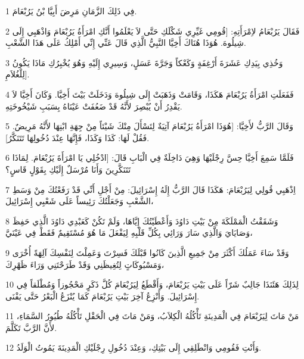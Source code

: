 \par 1 فِي ذَلِكَ الزَّمَانِ مَرِضَ أَبِيَّا بْنُ يَرُبْعَامَ.
\par 2 فَقَالَ يَرُبْعَامُ لاِمْرَأَتِهِ: [قُومِي غَيِّرِي شَكْلَكِ حَتَّى لاَ يَعْلَمُوا أَنَّكِ امْرَأَةُ يَرُبْعَامَ وَاذْهَبِي إِلَى شِيلُوهَ. هُوَذَا هُنَاكَ أَخِيَّا النَّبِيُّ الَّذِي قَالَ عَنِّي إِنِّي أَمْلِكُ عَلَى هَذَا الشَّعْبِ.
\par 3 وَخُذِي بِيَدِكِ عَشَرَةَ أَرْغِفَةٍ وَكَعْكاً وَجَرَّةَ عَسَلٍ، وَسِيرِي إِلَيْهِ وَهُوَ يُخْبِرُكِ مَاذَا يَكُونُ لِلْغُلاَمِ].
\par 4 فَفَعَلَتِ امْرَأَةُ يَرُبْعَامَ هَكَذَا، وَقَامَتْ وَذَهَبَتْ إِلَى شِيلُوهَ وَدَخَلَتْ بَيْتَ أَخِيَّا. وَكَانَ أَخِيَّا لاَ يَقْدِرُ أَنْ يُبْصِرَ لأَنَّهُ قَدْ ضَعُفَتْ عَيْنَاهُ بِسَبَبِ شَيْخُوخَتِهِ.
\par 5 وَقَالَ الرَّبُّ لأَخِيَّا: [هُوَذَا امْرَأَةُ يَرُبْعَامَ آتِيَةٌ لِتَسْأَلَ مِنْكَ شَيْئاً مِنْ جِهَةِ ابْنِهَا لأَنَّهُ مَرِيضٌ. فَقُلْ لَهَا: كَذَا وَكَذَا، فَإِنَّهَا عِنْدَ دُخُولِهَا تَتَنَكَّرُ].
\par 6 فَلَمَّا سَمِعَ أَخِيَّا حِسَّ رِجْلَيْهَا وَهِيَ دَاخِلَةٌ فِي الْبَابِ قَالَ: [ادْخُلِي يَا امْرَأَةَ يَرُبْعَامَ. لِمَاذَا تَتَنَكَّرِينَ وَأَنَا مُرْسَلٌ إِلَيْكِ بِقَوْلٍ قَاسٍ؟
\par 7 اِذْهَبِي قُولِي لِيَرُبْعَامَ: هَكَذَا قَالَ الرَّبُّ إِلَهُ إِسْرَائِيلَ: مِنْ أَجْلِ أَنِّي قَدْ رَفَعْتُكَ مِنْ وَسَطِ الشَّعْبِ وَجَعَلْتُكَ رَئِيساً عَلَى شَعْبِي إِسْرَائِيلَ،
\par 8 وَشَقَقْتُ الْمَمْلَكَةَ مِنْ بَيْتِ دَاوُدَ وَأَعْطَيْتُكَ إِيَّاهَا، وَلَمْ تَكُنْ كَعَبْدِي دَاوُدَ الَّذِي حَفِظَ وَصَايَايَ وَالَّذِي سَارَ وَرَائِي بِكُلِّ قَلْبِهِ لِيَفْعَلَ مَا هُوَ مُسْتَقِيمٌ فَقَطْ فِي عَيْنَيَّ،
\par 9 وَقَدْ سَاءَ عَمَلُكَ أَكْثَرَ مِنْ جَمِيعِ الَّذِينَ كَانُوا قَبْلَكَ فَسِرْتَ وَعَمِلْتَ لِنَفْسِكَ آلِهَةً أُخْرَى وَمَسْبُوكَاتٍ لِتُغِيظَنِي وَقَدْ طَرَحْتَنِي وَرَاءَ ظَهْرِكَ،
\par 10 لِذَلِكَ هَئَنَذَا جَالِبٌ شَرّاً عَلَى بَيْتِ يَرُبْعَامَ، وَأَقْطَعُ لِيَرُبْعَامَ كُلَّ ذَكَرٍ مَحْجُوزاً وَمُطْلَقاً فِي إِسْرَائِيلَ. وَأَنْزِعُ آخِرَ بَيْتِ يَرُبْعَامَ كَمَا يُنْزَعُ الْبَعْرُ حَتَّى يَفْنَى.
\par 11 مَنْ مَاتَ لِيَرُبْعَامَ فِي الْمَدِينَةِ تَأْكُلُهُ الْكِلاَبُ، وَمَنْ مَاتَ فِي الْحَقْلِ تَأْكُلُهُ طُيُورُ السَّمَاءِ، لأَنَّ الرَّبَّ تَكَلَّمَ.
\par 12 وَأَنْتِ فَقُومِي وَانْطَلِقِي إِلَى بَيْتِكِ، وَعِنْدَ دُخُولِ رِجْلَيْكِ الْمَدِينَةَ يَمُوتُ الْوَلَدُ.
